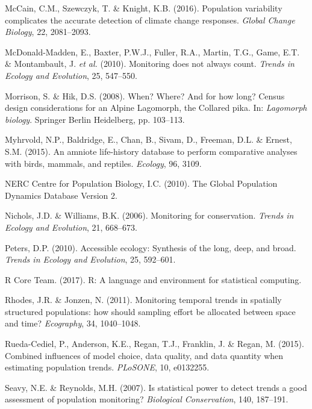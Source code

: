 \documentclass[12pt,]{article}
\begin{document}
\hypertarget{ref-McCain2016}{}
McCain, C.M., Szewczyk, T. \& Knight, K.B. (2016). Population
variability complicates the accurate detection of climate change
responses. \emph{Global Change Biology}, 22, 2081--2093.

\hypertarget{ref-McDonald-Madden2010}{}
McDonald-Madden, E., Baxter, P.W.J., Fuller, R.A., Martin, T.G., Game,
E.T. \& Montambault, J. \emph{et al.} (2010). Monitoring does not always
count. \emph{Trends in Ecology and Evolution}, 25, 547--550.

\hypertarget{ref-Morrison2008}{}
Morrison, S. \& Hik, D.S. (2008). When? Where? And for how long? Census
design considerations for an Alpine Lagomorph, the Collared pika. In:
\emph{Lagomorph biology}. Springer Berlin Heidelberg, pp. 103--113.

\hypertarget{ref-Myhrvold2015}{}
Myhrvold, N.P., Baldridge, E., Chan, B., Sivam, D., Freeman, D.L. \&
Ernest, S.M. (2015). An amniote life-history database to perform
comparative analyses with birds, mammals, and reptiles. \emph{Ecology},
96, 3109.

\hypertarget{ref-GPDD2010}{}
NERC Centre for Population Biology, I.C. (2010). The Global Population
Dynamics Database Version 2.

\hypertarget{ref-Nichols2006}{}
Nichols, J.D. \& Williams, B.K. (2006). Monitoring for conservation.
\emph{Trends in Ecology and Evolution}, 21, 668--673.

\hypertarget{ref-Peters2010}{}
Peters, D.P. (2010). Accessible ecology: Synthesis of the long, deep,
and broad. \emph{Trends in Ecology and Evolution}, 25, 592--601.

\hypertarget{ref-RCoreTeam2017}{}
R Core Team. (2017). R: A language and environment for statistical
computing.

\hypertarget{ref-Rhodes2011}{}
Rhodes, J.R. \& Jonzen, N. (2011). Monitoring temporal trends in
spatially structured populations: how should sampling effort be
allocated between space and time? \emph{Ecography}, 34, 1040--1048.

\hypertarget{ref-Rueda-Cediel2015}{}
Rueda-Cediel, P., Anderson, K.E., Regan, T.J., Franklin, J. \& Regan, M.
(2015). Combined influences of model choice, data quality, and data
quantity when estimating population trends. \emph{PLoSONE}, 10,
e0132255.

\hypertarget{ref-Seavy2007}{}
Seavy, N.E. \& Reynolds, M.H. (2007). Is statistical power to detect
trends a good assessment of population monitoring? \emph{Biological
Conservation}, 140, 187--191.
\end{document}
